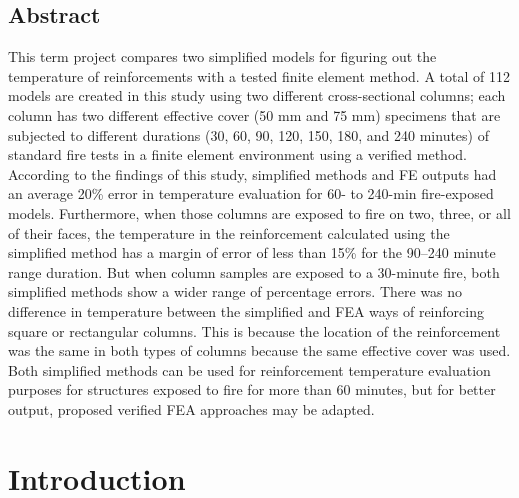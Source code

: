 \documentclass[12pt, letterpaper, oneside]{report}
\begin{document}
\begin{center}
\section*{Abstract}
\end{center}
This term project compares two simplified models for figuring out the temperature of reinforcements with a tested finite element method. A total of 112 models are created in this study using two different cross-sectional columns; each column has two different effective cover (50 mm and 75 mm) specimens that are subjected to different durations (30, 60, 90, 120, 150, 180, and 240 minutes) of standard fire tests in a finite element environment using a verified method. According to the findings of this study, simplified methods and FE outputs had an average 20\% error in temperature evaluation for 60- to 240-min fire-exposed models. Furthermore, when those columns are exposed to fire on two, three, or all of their faces, the temperature in the reinforcement calculated using the simplified method has a margin of error of less than 15\% for the 90–240 minute range duration. But when column samples are exposed to a 30-minute fire, both simplified methods show a wider range of percentage errors. There was no difference in temperature between the simplified and FEA ways of reinforcing square or rectangular columns. This is because the location of the reinforcement was the same in both types of columns because the same effective cover was used. Both simplified methods can be used for reinforcement temperature evaluation purposes for structures exposed to fire for more than 60 minutes, but for better output, proposed verified FEA approaches may be adapted.
\clearpage
\pagebreak
\tableofcontents
\listoffigures
\thispagestyle{empty}
\pagebreak

\cleardoublepage
\clearpage
{}
\setcounter{page}{1}
\renewcommand\thesection{\arabic{section}}

\section{Introduction}
\end{document}
